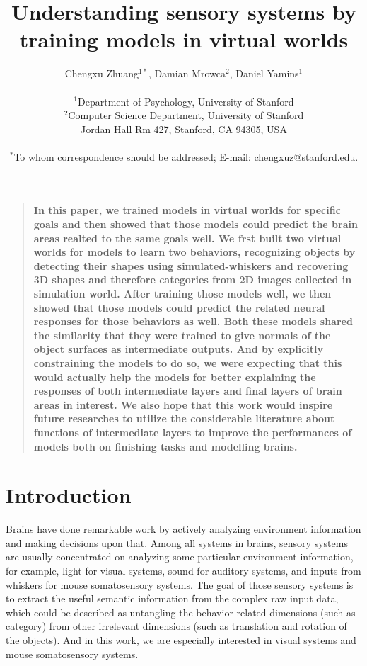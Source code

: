 \documentclass[12pt]{article}
\title{Understanding sensory systems by training models in virtual worlds}
\author
{Chengxu Zhuang$^{1\ast}$, Damian Mrowca$^{2}$, Daniel Yamins$^{1}$\\
\\
\normalsize{$^{1}$Department of Psychology, University of Stanford}\\
\normalsize{$^{2}$Computer Science Department, University of Stanford}\\
\normalsize{Jordan Hall Rm 427, Stanford, CA 94305, USA}\\
\\
\normalsize{$^\ast$To whom correspondence should be addressed; E-mail: chengxuz@stanford.edu.}
}
\date{}
\newenvironment{sciabstract}{%
\begin{quote} \bf}
{\end{quote}}
\begin{document}
 


\baselineskip24pt


\maketitle 


\begin{sciabstract}
    In this paper, we trained models in virtual worlds for specific goals and then showed that those models could predict the brain areas realted to the same goals well. 
    We frst built two virtual worlds for models to learn two behaviors, recognizing objects by detecting their shapes using simulated-whiskers and recovering 3D shapes and therefore categories from 2D images collected in simulation world. After training those models well, we then showed that those models could predict the related neural responses for those behaviors as well. 
    Both these models shared the similarity that they were trained to give normals of the object surfaces as intermediate outputs. And by explicitly constraining the models to do so, we were expecting that this would actually help the models for better explaining the responses of both intermediate layers and final layers of brain areas in interest. 
    We also hope that this work would inspire future researches to utilize the considerable literature about functions of intermediate layers to improve the performances of models both on finishing tasks and modelling brains.

\end{sciabstract}

\section*{Introduction}

Brains have done remarkable work by actively analyzing environment information and making decisions upon that. Among all systems in brains, sensory systems are usually concentrated on analyzing some particular environment information, for example, light for visual systems, sound for auditory systems, and inputs from whiskers for mouse somatosensory systems. 
The goal of those sensory systems is to extract the useful semantic information from the complex raw input data, which could be described as untangling the behavior-related dimensions (such as category) from other irrelevant dimensions (such as translation and rotation of the objects)\cite{yamins2016using}. And in this work, we are especially interested in visual systems and mouse somatosensory systems.
\end{document}
